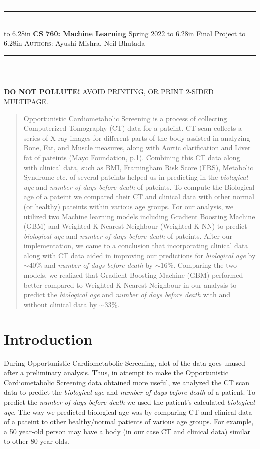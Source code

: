 \documentclass{article}
\newcommand{\lecture}[2]{
\pagestyle{myheadings}
\thispagestyle{plain}
\newpage
\noindent
\begin{center}
\rule{\textwidth}{1.6pt}\vspace*{-\baselineskip}\vspace*{2pt} %
\rule{\textwidth}{0.4pt}\\[1\baselineskip] %
\vbox{\vspace{2mm}
\hbox to 6.28in { {\bf CS 760: Machine Learning} \hfill Spring 2022 }
\vspace{4mm}
\hbox to 6.28in { {\Large \hfill #1  \hfill} }
\vspace{4mm}
\hbox to 6.28in { {\scshape Authors:}  #2 \hfill }}
\vspace{-2mm}
\rule{\textwidth}{0.4pt}\vspace*{-\baselineskip}\vspace{3.2pt} %
\rule{\textwidth}{1.6pt}\\[\baselineskip] %
\end{center}
\vspace*{4mm}
}
\begin{document}
\lecture{Final Project}{Ayushi Mishra, Neil Bhutada}

\begin{center}
{\Large {\sf \underline{\textbf{DO NOT POLLUTE!}} AVOID PRINTING, OR PRINT 2-SIDED MULTIPAGE.}}
\end{center}

\begin{abstract}
Opportunistic Cardiometabolic Screening is a process of collecting Computerized Tomography (CT) data for a pateint. CT scan collects a series of X-ray images for different parts of the body assisted in analyzing Bone, Fat, and Muscle measures, along with Aortic clarification and Liver fat of pateints (Mayo Foundation, p.1). Combining this CT data along with clinical data, such as BMI, Framingham Risk Score (FRS), Metabolic Syndrome etc. of several pateints helped us in predicting in the \emph{biological age} and \emph{number of days before death} of pateints. To compute the Biological age of a pateint we compared their CT and clinical data with other normal (or healthy) pateints within various age groups. For our analysis, we utilized two Machine learning models including Gradient Boosting Machine (GBM) and Weighted K-Nearest Neighbour (Weighted K-NN) to predict \emph{biological age} and \emph{number of days before death} of pateints. After our implementation, we came to a conclusion that incorporating clinical data along with CT data aided in improving our predictions for \emph{biological age} by $\sim{40}\%$ and \emph{number of days before death} by $\sim{16}\%$. Comparing the two models, we realized that Gradient Boosting Machine (GBM) performed better compared to Weighted K-Nearest Neighbour in our analysis to predict the \emph{biological age} and \emph{number of days before death} with and without clinical data by $\sim{33}\%$.
\end{abstract}

\section{Introduction}

During Opportunistic Cardiometabolic Screening, alot of the data goes unused after a preliminary analysis. Thus, in attempt to make the Opportunistic Cardiometabolic Screening data obtained more useful, we analyzed the CT scan data to predict the \emph{biological age} and \emph{number of days before death} of a patient. To predict the \emph{number of days before death} we used the patient's calculated \emph{biological age}. The way we predicted biological age was by comparing CT and clinical data of a pateint to other healthy/normal patients of various age groups. For example, a 50 year-old person may have a body (in our case CT and clinical data) similar to other 80 year-olds. 
  
\end{document}
